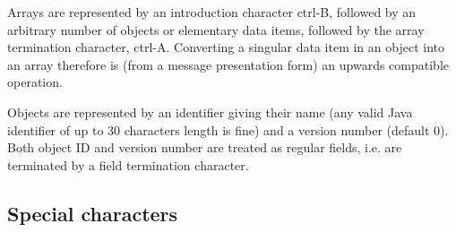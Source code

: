 \documentclass[11pt,a4paper,oneside]{article}
\begin{document}
Arrays are represented by an introduction character ctrl-B, followed by an
arbitrary number of objects or elementary data items, followed by the array
termination character, ctrl-A. Converting a singular data item in an object into
an array therefore is (from a message presentation form) an upwards compatible operation.

Objects are represented by an identifier giving their name (any valid Java
identifier of up to 30 characters length is fine) and a version number (default
0). Both object ID and version number are treated as regular fields, i.e. are
terminated by a field termination character.

\subsection{Special characters}
\end{document}
